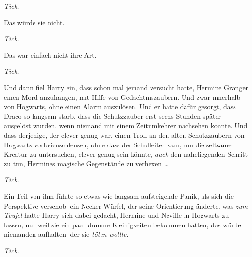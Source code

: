 \emph{Tick.}

Das würde sie nicht.

\emph{Tick.}

Das war einfach nicht ihre Art.

\emph{Tick.}

Und dann fiel Harry ein, dass schon mal jemand versucht hatte, Hermine Granger einen Mord anzuhängen, mit Hilfe von Gedächtniszaubern. Und zwar innerhalb von Hogwarts, ohne einen Alarm auszulösen. Und er hatte dafür gesorgt, dass Draco so langsam starb, dass die Schutzzauber erst sechs Stunden später ausgelöst wurden, wenn niemand mit einem Zeitumkehrer nachsehen konnte. Und dass derjenige, der clever genug war, einen Troll an den alten Schutzzaubern von Hogwarts vorbeizuschleusen, ohne dass der Schulleiter kam, um die seltsame Kreatur zu untersuchen, clever genug sein könnte, \emph{auch} den naheliegenden Schritt zu tun, Hermines magische Gegenstände zu verhexen …

\emph{Tick.}

Ein Teil von ihm fühlte so etwas wie langsam aufsteigende Panik, als sich die Perspektive verschob, ein Necker-Würfel, der seine Orientierung änderte, was \emph{zum Teufel} hatte Harry sich dabei gedacht, Hermine und Neville in Hogwarts zu lassen, nur weil sie ein paar dumme Kleinigkeiten bekommen hatten, das würde niemanden aufhalten, der sie \emph{töten wollte}.

\emph{Tick.}

